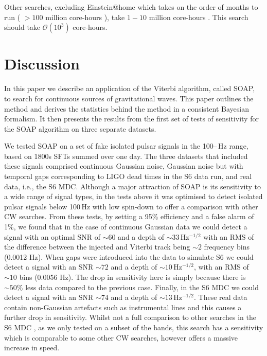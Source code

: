 Other searches, excluding Einstein@home which takes on the order of months to run ( $>100$ million core-hours \citep{walsh2016ComparisonMethods}), take $1-10$ million core-hours \citep{walsh2016ComparisonMethods}. This search should take $\mathcal{O}(10^3)$ core-hours.

\section{\label{soap:dicussion}Discussion}

In this paper we describe an application of the Viterbi algorithm, called SOAP, to
search for continuous sources of gravitational waves.
This paper outlines the method and derives the statistics behind the method in a consistent Bayesian formalism. It then presents the results from the first set of tests of sensitivity for the SOAP algorithm on three separate datasets.

%
%
We tested SOAP on a set of fake isolated pulsar signals in the
100\;--\,Hz range, based on 1800s \glspl{SFT} summed over one day.
The three datasets that included these signals comprised continuous Gaussian noise, Gaussian noise but with temporal gaps corresponding to LIGO dead times in the S6 data run, and real data, i.e., the
S6 \gls{MDC}. Although a major attraction of SOAP is its sensitivity to a wide
range of signal types, in the tests above it was optimised to detect isolated pulsar signals below 100\,Hz with low spin-down to offer a comparison with other \gls{CW} searches. From these tests, by setting a
95\% efficiency and a false alarm of 1\%, we found that in the case of  continuous Gaussian data we could detect a signal with an optimal \gls{SNR} of $\sim 60$ and a
depth of $\sim 33$\,Hz$^{-1/2}$ with an \gls{RMS} of the difference between the injected and Viterbi track being $\sim 2$ frequency bins (0.0012 Hz).
When gaps were introduced into the data to simulate S6 we could detect a signal with an
\gls{SNR} $\sim 72$  and a depth of $\sim 10$\,Hz$^{-1/2}$, with an \gls{RMS} of $\sim 10$ bins (0.0056 Hz). The drop in sensitivity here is simply because  there is $\sim 50 \%$ less data compared to the previous case. Finally, in the S6 \gls{MDC} we could
detect a signal with an \gls{SNR} $\sim 74$ and a depth of $\sim
13$\,Hz$^{-1/2}$.
These real data contain non-Gaussian artefacts such as instrumental lines and this causes a further drop in sensitivity.
Whilst not a full comparison to other searches in the S6 \gls{MDC} \citep{walsh2016ComparisonMethods}, as we only tested on a subset
of the bands, this search has a sensitivity which is comparable to some other \gls{CW} searches, however offers a massive increase in speed.

